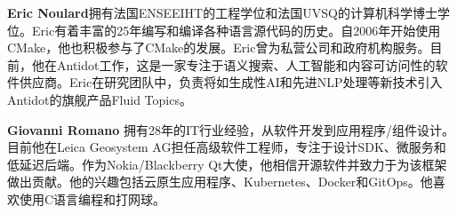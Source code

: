 \textbf{Eric Noulard}拥有法国ENSEEIHT的工程学位和法国UVSQ的计算机科学博士学位。Eric有着丰富的25年编写和编译各种语言源代码的历史。自2006年开始使用CMake，他也积极参与了CMake的发展。Eric曾为私营公司和政府机构服务。目前，他在Antidot工作，这是一家专注于语义搜索、人工智能和内容可访问性的软件供应商。Eric在研究团队中，负责将如生成性AI和先进NLP处理等新技术引入Antidot的旗舰产品Fluid Topics。

\hspace*{\fill}
\hspace*{\fill}

\textbf{Giovanni Romano} 拥有28年的IT行业经验，从软件开发到应用程序/组件设计。目前他在Leica Geosystem AG担任高级软件工程师，专注于设计SDK、微服务和低延迟后端。作为Nokia/Blackberry Qt大使，他相信开源软件并致力于为该框架做出贡献。他的兴趣包括云原生应用程序、Kubernetes、Docker和GitOps。他喜欢使用C语言编程和打网球。

